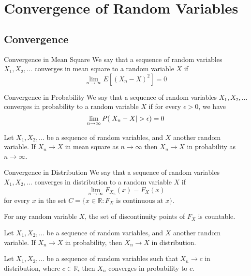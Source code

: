 \documentclass[a4paper]{article}
\begin{document}
\pagebreak
\section{Convergence of Random Variables}
\subsection{Convergence}
\begin{defn}{Convergence in Mean Square}{} We say that a sequence of random variables $X_1,X_2,\dots$ converges in mean square to a random variable $X$ if $$\lim_{n\to\infty}E[(X_n-X)^2]=0$$
\end{defn}

\begin{defn}{Convergence in Probability}{} We say that a sequence of random variables $X_1,X_2,\dots$ converges in probability to a random variable $X$ if for every $\epsilon>0$, we have $$\lim_{n\to\infty}P(\abs{X_n-X}>\epsilon)=0$$
\end{defn}

\begin{thm}{}{} Let $X_1,X_2,\dots$ be a sequence of random variables, and $X$ another random variable. If $X_n\to X$ in mean square as $n\to\infty$ then $X_n\to X$ in probability as $n\to\infty$. 
\end{thm}

\begin{defn}{Convergence in Distribution}{} We say that a sequence of random variables $X_1,X_2,\dots$ converges in distribution to a random variable $X$ if $$\lim_{n\to\infty}F_{X_n}(x)=F_X(x)$$ for every $x$ in the set $C=\{x\in\mathbb{R}:F_X\text{ is continuous at } x\}$. 
\end{defn}

\begin{thm}{}{} For any random variable $X$, the set of discontinuity points of $F_X$ is countable. 
\end{thm}

\begin{thm}{}{} Let $X_1,X_2,\dots$ be a sequence of random variables, and $X$ another random variable. If $X_n\to X$ in probability, then $X_n\to X$ in distribution. 
\end{thm}

\begin{thm}{}{} Let $X_1,X_2,\dots$ be a sequence of random variables such that $X_n\to c$ in distribution, where $c\in\mathbb{R}$, then $X_n$ converges in probability to $c$. 
\end{thm}
\end{document}
